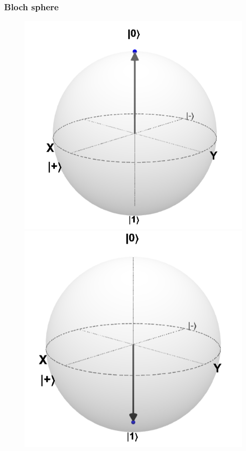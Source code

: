 \documentclass{beamer}
\begin{document}
\begin{frame}%
\frametitle{Bloch sphere}
\begin{figure}
\includegraphics[scale=0.2]{ket0}\quad
\includegraphics[scale=0.2]{ket1}
\end{figure}

\end{frame}
\end{document}
